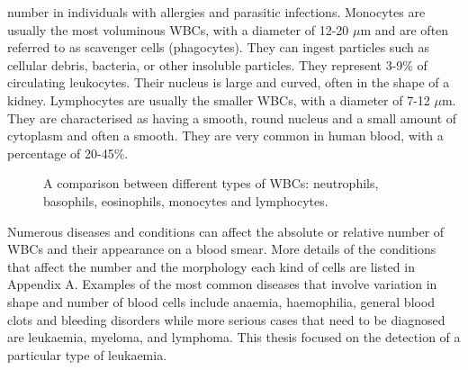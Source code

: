\documentclass[final,a4paper,12pt,english]{UnicaPhdThesis3}
\begin{document}
number in individuals with allergies and parasitic infections. Monocytes are usually the most voluminous WBCs, with a diameter of 12-20 $\mu$m and are often referred to as scavenger cells (phagocytes). They can ingest particles such as cellular debris, bacteria, or other insoluble particles. They represent 3-9\% of circulating leukocytes. Their nucleus is large and curved, often in the shape of a kidney. Lymphocytes are usually the smaller WBCs, with a diameter of 7-12 $\mu$m. They are characterised as having a smooth, round nucleus and a small amount of cytoplasm and often a smooth. They are very common in human blood, with a percentage of 20-45\%. 
	
	\begin{figure}[!htbp]
		\centering
		\caption{\label{fig:leukocytes}A comparison between different types of WBCs: neutrophils, basophils, eosinophils, monocytes and lymphocytes.}
	\end{figure}
	
	Numerous diseases and conditions can affect the absolute or relative number of WBCs and their appearance on a blood smear. More details of the conditions that affect the number and the morphology each kind of cells are listed in Appendix A. Examples of the most common diseases that involve variation in shape and number of blood cells include anaemia, haemophilia, general blood clots and bleeding disorders while more serious cases that need to be diagnosed are leukaemia, myeloma, and lymphoma. This thesis focused on the detection of a particular type of leukaemia.  
	
\end{document}
